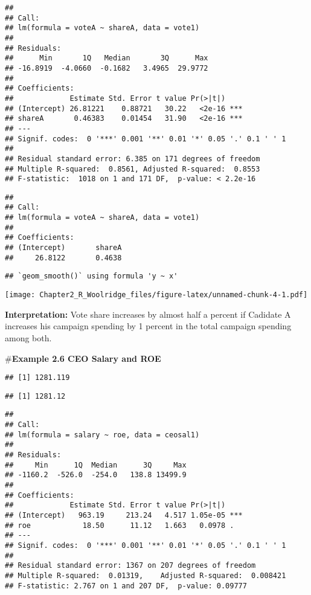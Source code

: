\documentclass[
]{article}
\begin{document}
\begin{verbatim}
## 
## Call:
## lm(formula = voteA ~ shareA, data = vote1)
## 
## Residuals:
##      Min       1Q   Median       3Q      Max 
## -16.8919  -4.0660  -0.1682   3.4965  29.9772 
## 
## Coefficients:
##             Estimate Std. Error t value Pr(>|t|)    
## (Intercept) 26.81221    0.88721   30.22   <2e-16 ***
## shareA       0.46383    0.01454   31.90   <2e-16 ***
## ---
## Signif. codes:  0 '***' 0.001 '**' 0.01 '*' 0.05 '.' 0.1 ' ' 1
## 
## Residual standard error: 6.385 on 171 degrees of freedom
## Multiple R-squared:  0.8561, Adjusted R-squared:  0.8553 
## F-statistic:  1018 on 1 and 171 DF,  p-value: < 2.2e-16
\end{verbatim}

\begin{verbatim}
## 
## Call:
## lm(formula = voteA ~ shareA, data = vote1)
## 
## Coefficients:
## (Intercept)       shareA  
##     26.8122       0.4638
\end{verbatim}

\begin{verbatim}
## `geom_smooth()` using formula 'y ~ x'
\end{verbatim}

\texttt{[image: Chapter2\_R\_Woolridge\_files/figure-latex/unnamed-chunk-4-1.pdf]}

\textbf{Interpretation: } Vote share increases by almost half a percent
if Cadidate A increases his campaign spending by 1 percent in the total
campaign spending among both.

\#\textbf{Example 2.6 CEO Salary and ROE}

\begin{verbatim}
## [1] 1281.119
\end{verbatim}

\begin{verbatim}
## [1] 1281.12
\end{verbatim}

\begin{verbatim}
## 
## Call:
## lm(formula = salary ~ roe, data = ceosal1)
## 
## Residuals:
##     Min      1Q  Median      3Q     Max 
## -1160.2  -526.0  -254.0   138.8 13499.9 
## 
## Coefficients:
##             Estimate Std. Error t value Pr(>|t|)    
## (Intercept)   963.19     213.24   4.517 1.05e-05 ***
## roe            18.50      11.12   1.663   0.0978 .  
## ---
## Signif. codes:  0 '***' 0.001 '**' 0.01 '*' 0.05 '.' 0.1 ' ' 1
## 
## Residual standard error: 1367 on 207 degrees of freedom
## Multiple R-squared:  0.01319,    Adjusted R-squared:  0.008421 
## F-statistic: 2.767 on 1 and 207 DF,  p-value: 0.09777
\end{verbatim}
\end{document}
